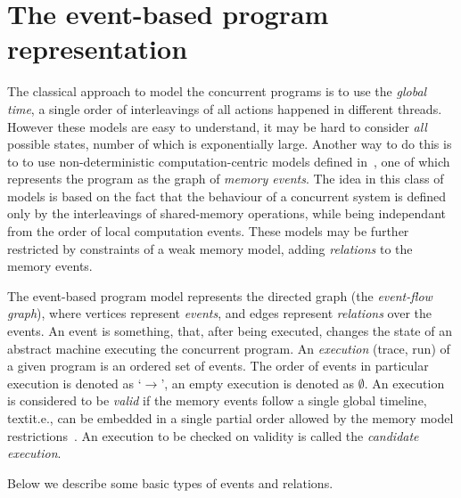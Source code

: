 
\section{The event-based program representation}
\label{ch:wmm:event}


The classical approach to model the concurrent programs is to use the \textit{global time}, a single order of interleavings of all actions happened in different threads. However these models are easy to understand, it may be hard to consider \textit{all} possible states, number of which is exponentially large. Another way to do this is to to use non-deterministic computation-centric models defined in~\cite{fri97}, one of which represents the program as the graph of \textit{memory events}. The idea in this class of models is based on the fact that the behaviour of a concurrent system is defined only by the interleavings of shared-memory operations, while being independant from the order of local computation events. These models may be further restricted by constraints of a weak memory model, adding \textit{relations} to the memory events.

The event-based program model represents the directed graph (the \textit{event-flow graph}), where vertices represent \textit{events}, and edges represent \textit{relations} over the events. An event is something, that, after being executed, changes the state of an abstract machine executing the concurrent program. 
An \textit{execution} (trace, run) of a given program is an ordered set of events. The order of events in particular execution is denoted as `$\rightarrow$', an empty execution is denoted as $\emptyset$.
An execution is considered to be \textit{valid} if the memory events follow a single global timeline, textit.e., can be embedded in a single partial order allowed by the memory model restrictions~\cite{alglave2010shared}. An execution to be checked on validity is called the \textit{candidate execution}.

Below we describe some basic types of events and relations.

